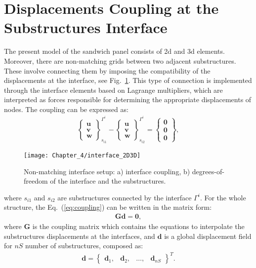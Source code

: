 \section{Displacements Coupling at the Substructures Interface}
\label{sec:interface}


The present model of the sandwich panel consists of \ac{2d} and \ac{3d} elements. 
Moreover, there are non-matching grids between two adjacent substructures. 
These involve connecting them by imposing the compatibility of the displacements at the interface, see Fig.~\ref{fig:interface}.
This type of connection is implemented through the interface elements based on Lagrange multipliers, which are interpreted as forces responsible for determining the appropriate displacements of nodes.
The coupling can be expressed as:
\begin{eqnarray}
	\left\{\begin{array}{c}
		\textbf{u}\\
		\textbf{v}\\
		\textbf{w}
	\end{array}\right\}_{s_{i1}}^{\Gamma^i}-
	\left\{\begin{array}{c}
		\textbf{u}\\
		\textbf{v}\\
		\textbf{w}
	\end{array}\right\}_{s_{i2}}^{\Gamma^i}=
	\left\{\begin{array}{c}
		\textbf{0}\\
		\textbf{0}\\
		\textbf{0}
	\end{array}\right\},
	\label{eq:coupling}
\end{eqnarray}
\begin{figure}
	\begin{center}
		\texttt{[image: Chapter\_4/interface\_2D3D]}
	\end{center}
	\caption{Non-matching interface setup: a) interface coupling, b) degrees-of-freedom of the interface and the substructures.}
	\label{fig:interface}
\end{figure}
where \(s_{i1}\) and \(s_{i2}\) are substructures connected by the interface \(\Gamma^i\). For the whole structure, the Eq.~(\ref{eq:coupling}) can be written in the matrix form:
\begin{eqnarray}
	\textbf{G}\textbf{d}=\textbf{0},
	\label{eq:cond_disp}
\end{eqnarray}
where \textbf{G} is the coupling matrix which contains the equations to interpolate the substructures displacements at the interfaces, and \(\textbf{d}\) is a global displacement field for \(nS\) number of substructures, composed as:
\begin{eqnarray}
	\textbf{d} = \left\{\begin{array}{cccc}
		\textbf{d}_1, & \textbf{d}_2, &\ldots, & \textbf{d}_{nS}
	\end{array}\right\}^T.
	\label{eq:displacements}
\end{eqnarray}

